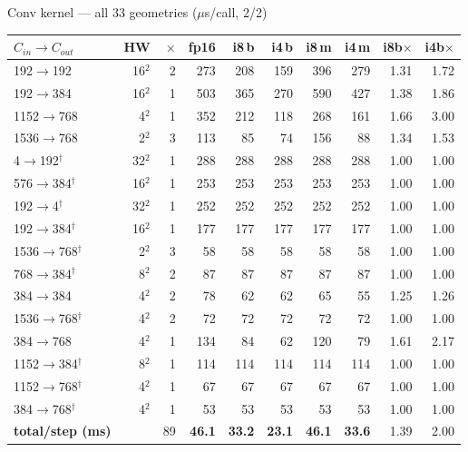\documentclass[aspectratio=169,10pt]{beamer}
\newcommand{\g}[1]{{\footnotesize\color{gray}#1}}
\begin{document}
\begin{frame}{Conv kernel --- all 33 geometries \g{($\mu$s/call, 2/2)}}
\centering\tiny\begin{tabular}{@{}lrrrrrrrrr@{}}\toprule
$C_{in}\!\to\!C_{out}$ & HW & $\times$ & fp16 & i8\,b & i4\,b & i8\,m & i4\,m & i8b$\times$ & i4b$\times$\\\midrule
192$\to$192 & 16$^2$ & 2 & 273 & 208 & 159 & 396 & 279 & 1.31 & 1.72\\
192$\to$384 & 16$^2$ & 1 & 503 & 365 & 270 & 590 & 427 & 1.38 & 1.86\\
1152$\to$768 & 4$^2$ & 1 & 352 & 212 & 118 & 268 & 161 & 1.66 & 3.00\\
1536$\to$768 & 2$^2$ & 3 & 113 & 85 & 74 & 156 & 88 & 1.34 & 1.53\\
4$\to$192$^\dagger$ & 32$^2$ & 1 & 288 & 288 & 288 & 288 & 288 & 1.00 & 1.00\\
576$\to$384$^\dagger$ & 16$^2$ & 1 & 253 & 253 & 253 & 253 & 253 & 1.00 & 1.00\\
192$\to$4$^\dagger$ & 32$^2$ & 1 & 252 & 252 & 252 & 252 & 252 & 1.00 & 1.00\\
192$\to$384$^\dagger$ & 16$^2$ & 1 & 177 & 177 & 177 & 177 & 177 & 1.00 & 1.00\\
1536$\to$768$^\dagger$ & 2$^2$ & 3 & 58 & 58 & 58 & 58 & 58 & 1.00 & 1.00\\
768$\to$384$^\dagger$ & 8$^2$ & 2 & 87 & 87 & 87 & 87 & 87 & 1.00 & 1.00\\
384$\to$384 & 4$^2$ & 2 & 78 & 62 & 62 & 65 & 55 & 1.25 & 1.26\\
1536$\to$768$^\dagger$ & 4$^2$ & 2 & 72 & 72 & 72 & 72 & 72 & 1.00 & 1.00\\
384$\to$768 & 4$^2$ & 1 & 134 & 84 & 62 & 120 & 79 & 1.61 & 2.17\\
1152$\to$384$^\dagger$ & 8$^2$ & 1 & 114 & 114 & 114 & 114 & 114 & 1.00 & 1.00\\
1152$\to$768$^\dagger$ & 4$^2$ & 1 & 67 & 67 & 67 & 67 & 67 & 1.00 & 1.00\\
384$\to$768$^\dagger$ & 4$^2$ & 1 & 53 & 53 & 53 & 53 & 53 & 1.00 & 1.00\\
\midrule
\textbf{total/step (ms)} & & 89 & \textbf{46.1} & \textbf{33.2} & \textbf{23.1} & \textbf{46.1} & \textbf{33.6} & 1.39 & 2.00\\
\bottomrule\end{tabular}
\par{}
\end{frame}
\end{document}

